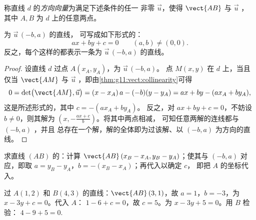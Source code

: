 \begin{definition}[方向向量]\label{def:g11:vect:direction}
称直线 $d$ 的\emph{方向向量}为满足下述条件的任一
非零 $\vec u$，使得 $\vect{AB}$ 与 $\vec u$ ，
其中 $A, B$ 为 $d$ 上的任意两点。
\end{definition}

\begin{theorem}[一般式方程]\label{thm:g11:vect:cartesian}
为 $\vec u\,(-b, a)$ 的直线，
可写成如下形式的：
\[
ax + by + c = 0
\qquad (a, b) \neq (0, 0).
\]
反之，每个这样的都表示一条为
$\vec u\,(-b, a)$ 的直线。
\end{theorem}

\begin{proof}
设直线 $d$ 过点 $A(x_A, y_A)$，为 $\vec u\,(-b, a)$。
点 $M(x, y)$ 在 $d$ 上，当且仅当 $\vect{AM}$ 与
$\vec u$ ，即由\cref{thm:g11:vect:collinearity}可得
\[
0 = \det\bigl(\vect{AM}, \vec u\bigr)
= (x - x_A)\,a - (-b)(y - y_A)
= ax + by - (a x_A + b y_A),
\]
这是所述形式的，其中 $c = -(a x_A + b y_A)$。
反之，对 $ax + by + c = 0$，不妨设 $b \neq 0$，则其解为
$\left(x, -\frac{a x + c}{b}\right)$。将其中两点相减，
可知任意两解的连线都与 $(-b, a)$ ，并且
总存在一个解，解的全体即为过该解、以 $(-b, a)$ 为方向的直线。
\end{proof}

\begin{method}[过两点的直线]\label{met:g11:vect:twopoints}
求直线 $(AB)$ 的：计算
$\vect{AB}\,(x_B - x_A, y_B - y_A)$；使其与 $(-b, a)$ 对应，即取
$a = y_B - y_A$，$b = -(x_B - x_A)$；再代入以确定 $c$，
即把 $A$ 的坐标代入。
\end{method}

\begin{example}\label{ex:g11:vect:twopoints}
过 $A(1, 2)$ 和 $B(4, 3)$ 的直线：$\vect{AB}\,(3, 1)$，故
$a = 1$，$b = -3$，为 $x - 3y + c = 0$。代入 $A$：
$1 - 6 + c = 0$，故 $c = 5$。为 $x - 3y + 5 = 0$。用 $B$ 检验：
$4 - 9 + 5 = 0$.
\end{example}

